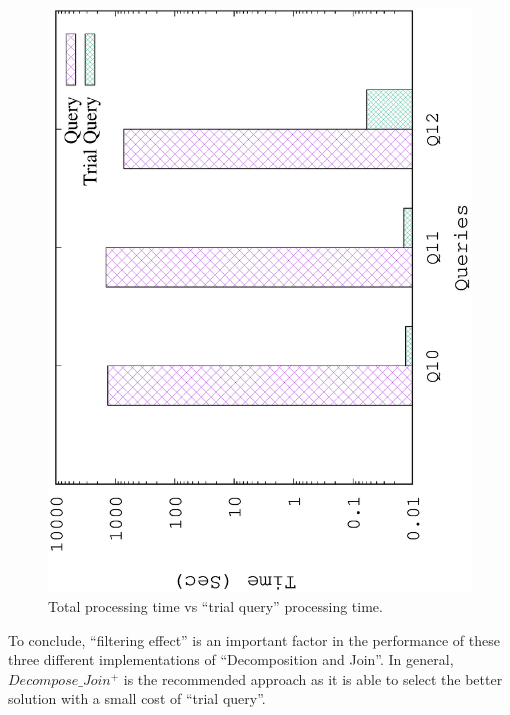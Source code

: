 \begin{figure}[H]
	\centering
	\includegraphics[scale=0.47, angle=270]{plot/threesample.eps}
	\caption{Total processing time vs ``trial query'' processing time.}
	\label{fig:threesample}
\end{figure}

To conclude, ``filtering effect'' is an important factor in the performance of these three different implementations of ``Decomposition and Join''. In general, $Decompose\_Join^{+}$ is the recommended approach as it is able to select the better solution with a small cost of ``trial query''.


%

